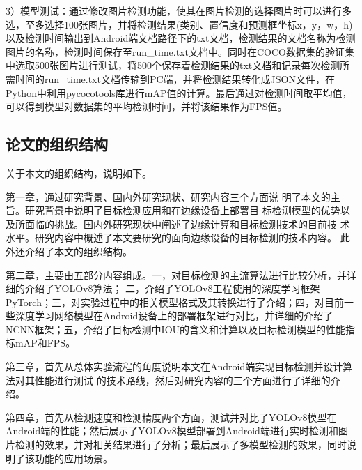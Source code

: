 \documentclass{ctexart}
\numberwithin{equation}{section}%
\numberwithin{figure}{section}%
\numberwithin{table}{section}%
\begin{document}
	3）模型测试：通过修改图片检测功能，使其在图片检测的选择图片时可以进行多选，至多选择100张图片，并将检测结果(类别、置信度和预测框坐标x，y，w，h)以及检测时间输出到Android端文档路径下的txt文档，检测结果的文档名称为检测图片的名称，检测时间保存至run\_time.txt文档中。同时在COCO数据集的验证集中选取500张图片进行测试，将500个保存着检测结果的txt文档和记录每次检测所需时间的run\_time.txt文档传输到PC端，并将检测结果转化成JSON文件，在Python中利用pycocotools库进行mAP值的计算。最后通过对检测时间取平均值，可以得到模型对数据集的平均检测时间，并将该结果作为FPS值。
	
	\subsection{论文的组织结构}
	关于本文的组织结构，说明如下。
	
	第一章，通过研究背景、国内外研究现状、研究内容三个方面说
	明了本文的主旨。研究背景中说明了目标检测应用和在边缘设备上部署目
	标检测模型的优势以及所面临的挑战。国内外研究现状中阐述了边缘计算和目标检测技术的目前技
	术水平。研究内容中概述了本文要研究的面向边缘设备的目标检测的技术内容。
	此外还介绍了本文的组织结构。
	
	第二章，主要由五部分内容组成。一，对目标检测的主流算法进行比较分析，并详细的介绍了YOLOv8算法；
	二，介绍了YOLOv8工程使用的深度学习框架PyTorch；三，对实验过程中的相关模型格式及其转换进行了介绍；四，对目前一些深度学习网络模型在Android设备上的部署框架进行对比，并详细的介绍了NCNN框架；五，介绍了目标检测中IOU的含义和计算以及目标检测模型的性能指标mAP和FPS。

	第三章，首先从总体实验流程的角度说明本文在Android端实现目标检测并设计算法对其性能进行测试
	的技术路线，然后对研究内容的三个方面进行了详细的介绍。

	第四章，首先从检测速度和检测精度两个方面，测试并对比了YOLOv8模型在Android端的性能；然后展示了YOLOv8模型部署到Android端进行实时检测和图片检测的效果，并对相关结果进行了分析；最后展示了多模型检测的效果，同时说明了该功能的应用场景。

	
\end{document}
